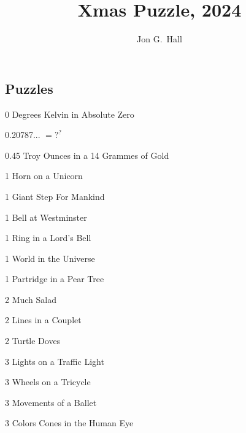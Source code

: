 \documentclass[10pt]{article}
\title{ Xmas Puzzle, 2024 }
\author{Jon G.~Hall}
\begin{document}
\maketitle

\RaggedRight
\def\columnseprule{0.4pt}

\begin{multicols}{4}

\section*{Puzzles}

\newcommand{\w}[2]{#1\underline{\hspace{0.5cm}}}
\renewcommand{\w}[2]{#1#2}

\begin{description}
    \item 0 \w D{egrees} \w K{elvin} in \w A{bsolute} \w Z{ero}
     \item 0.20787... $=?^?$
     \item 0.45 \w T{roy} \w O{unces} in a 14 \w G{rammes} of \w G{old}
    \item 1 \w H{orn} on a \w U{nicorn}
    \item 1 \w G{iant} \w S{tep} \w F{or} \w M{ankind}
    \item 1 \w B{ell} at \w W{estminster}
    \item 1 \w R{ing} in a \w L{ord's} \w B{ell}
    \item 1 \w W{orld} in the \w U{niverse}
    \item 1 \w P{artridge} in a \w P{ear} \w T{ree}
    \item 2 \w M{uch} \w S{alad}
    \item 2 \w L{ines} in a \w C{ouplet}
    \item 2 \w T{urtle} \w D{oves}
    \item 3 \w L{ights} on a \w T{raffic} \w L{ight}
    \item 3 \w W{heels} on a \w T{ricycle}
    \item 3 \w M{ovements} of a \w B{allet}
    \item 3 \w C{olors} \w C{ones} in the \w H{uman} \w E{ye}

\end{description}
\end{multicols}
\end{document}
